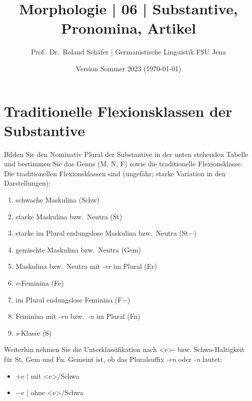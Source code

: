 \documentclass[12pt,a4paper,twoside]{article}
\author{Prof.\ Dr.\ Roland Schäfer | Germanistische Linguistik FSU Jena}
\title{Morphologie | 06 | Substantive, Pronomina, Artikel}
\date{Version Sommer 2023 (\today)}
\newcommand{\Lf}{
  \setlength{\itemsep}{1pt}
  \setlength{\parskip}{0pt}
  \setlength{\parsep}{0pt}
}
\begin{document}
\maketitle

\section{Traditionelle Flexionsklassen der Substantive}

Bilden Sie den Nominativ Plural der Substantive in der unten stehenden Tabelle und bestimmen Sie das Genus (M, N, F) sowie die traditionelle Flexionsklasse.
Die traditionellen Flexionsklassen sind (ungefähr; starke Variation in den Darstellungen):

\begin{enumerate}\Lf
  \item schwache Maskulina (Schw) %
  \item starke Maskulina bzw.\ Neutra (St) %
  \item starke im Plural endungslose Maskulina bzw.\ Neutra (St$-$) %
  \item gemischte Maskulina bzw.\ Neutra (Gem) %
  \item Maskulina bzw.\ Neutra mit \textit{-er} im Plural (Er)\footnotemark[1] %
  \item \textit{e}-Feminina (Fe)\footnotemark[1] %
  \item im Plural endungslose Feminina (F$-$)\footnotemark[1] %
  \item Feminina mit \textit{-en} bzw.\ \textit{-n} im Plural (Fn)\footnotemark[2] %
  \item \textit{s}-Klasse (S) %
\end{enumerate}


Weiterhin nehmen Sie die Unterklassifikation nach <e>- bzw. Schwa-Haltigkeit für St, Gem und Fn. Gemeint ist, ob das Pluralsuffix \textit{-en} oder \textit{-n} lautet:

\begin{itemize}\Lf
  \item $+$e | mit <e>\slash Schwa
  \item $-$e | ohne <e>\slash Schwa
\end{itemize}
\end{document}
